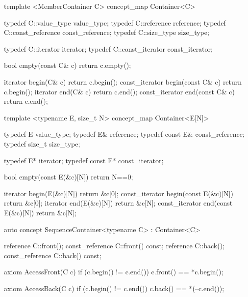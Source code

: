 \documentclass[american,twoside]{book}
\begin{document}
\begin{itemdescr}
\pnum
{}

\pnum
\addedConcepts{\mbox{\requires} for a (possibly
  \mbox{\tcode{const}}-qualified) container \mbox{\tcode{c}},
  \mbox{\tcode{[c.begin(), c.end())}} is a valid range.}
\end{itemdescr}

\begin{itemdecl}
template <MemberContainer C>
concept_map Container<C> {
  typedef C::value_type      value_type;
  typedef C::reference       reference;
  typedef C::const_reference const_reference;
  typedef C::size_type       size_type;

  typedef C::iterator        iterator;
  typedef C::const_iterator  const_iterator;

  bool           empty(const C& c) { return c.empty(); }

  iterator       begin(C& c)       { return c.begin(); }
  const_iterator begin(const C& c) { return c.begin(); }
  iterator       end(C& c)         { return c.end(); }
  const_iterator end(const C& c)   { return c.end(); }
}
\end{itemdecl}

\begin{itemdecl}
template <typename E, size_t N>
concept_map Container<E[N]> {
  typedef E                  value_type;
  typedef E&                 reference;
  typedef const E&           const_reference;
  typedef size_t             size_type;

  typedef E*                 iterator;
  typedef const E*           const_iterator;

  bool           empty(const E(&c)[N]) { return N==0; }

  iterator       begin(E(&c)[N])       { return &c[0]; }
  const_iterator begin(const E(&c)[N]) { return &c[0]; }
  iterator       end(E(&c)[N])         { return &c[N]; }
  const_iterator end(const E(&c)[N])   { return &c[N]; }
}
\end{itemdecl}

\begin{itemdecl}
auto concept SequenceContainer<typename C> : Container<C> {
  reference       C::front();
  const_reference C::front() const;
  reference       C::back();
  const_reference C::back() const;

  axiom AccessFront(C c) {
    if (c.begin() != c.end()) c.front() == *c.begin();
  }  

  axiom AccessBack(C c) {
    if (c.begin() != c.end()) c.back() == *(--c.end());
  }
}
\end{itemdecl}
\end{document}

